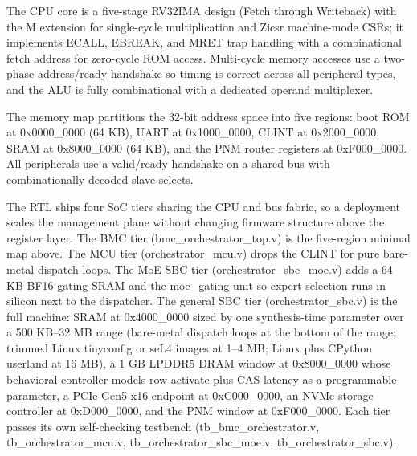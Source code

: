 \documentclass[12pt,onecolumn]{article}
\begin{document}
The CPU core is a five-stage RV32IMA design (Fetch through Writeback) with the M extension for single-cycle multiplication and Zicsr machine-mode CSRs; it implements ECALL, EBREAK, and MRET trap handling with a combinational fetch address for zero-cycle ROM access. Multi-cycle memory accesses use a two-phase address/ready handshake so timing is correct across all peripheral types, and the ALU is fully combinational with a dedicated operand multiplexer.

The memory map partitions the 32-bit address space into five regions: boot ROM at 0x0000\_0000 (64 KB), UART at 0x1000\_0000, CLINT at 0x2000\_0000, SRAM at 0x8000\_0000 (64 KB), and the PNM router registers at 0xF000\_0000. All peripherals use a valid/ready handshake on a shared bus with combinationally decoded slave selects.

The RTL ships four SoC tiers sharing the CPU and bus fabric, so a deployment scales the management plane without changing firmware structure above the register layer. The BMC tier (bmc\_orchestrator\_top.v) is the five-region minimal map above. The MCU tier (orchestrator\_mcu.v) drops the CLINT for pure bare-metal dispatch loops. The MoE SBC tier (orchestrator\_sbc\_moe.v) adds a 64 KB BF16 gating SRAM and the moe\_gating unit so expert selection runs in silicon next to the dispatcher. The general SBC tier (orchestrator\_sbc.v) is the full machine: SRAM at 0x4000\_0000 sized by one synthesis-time parameter over a 500 KB--32 MB range (bare-metal dispatch loops at the bottom of the range; trimmed Linux tinyconfig or seL4 images at 1--4 MB; Linux plus CPython userland at 16 MB), a 1 GB LPDDR5 DRAM window at 0x8000\_0000 whose behavioral controller models row-activate plus CAS latency as a programmable parameter, a PCIe Gen5 x16 endpoint at 0xC000\_0000, an NVMe storage controller at 0xD000\_0000, and the PNM window at 0xF000\_0000. Each tier passes its own self-checking testbench (tb\_bmc\_orchestrator.v, tb\_orchestrator\_mcu.v, tb\_orchestrator\_sbc\_moe.v, tb\_orchestrator\_sbc.v).
\end{document}

